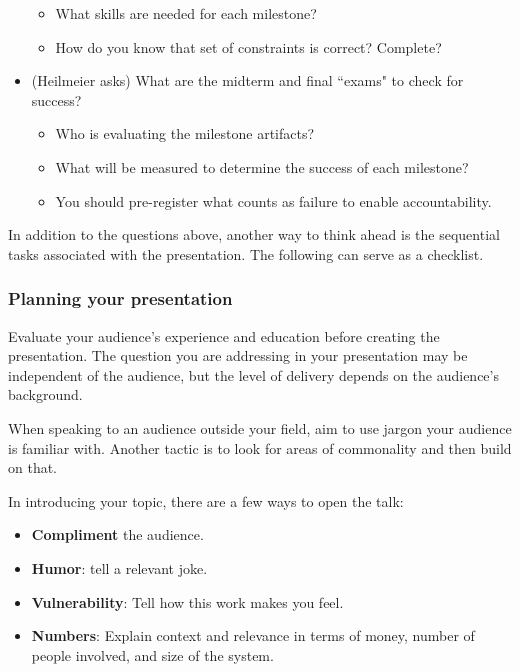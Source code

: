 \begin{itemize}
\begin{itemize}
        \item What skills are needed for each milestone?
        \item How do you know that set of constraints is correct? Complete?
    \end{itemize}
    \item (Heilmeier asks) What are the midterm and final ``exams" to check for success?
    \begin{itemize}
        \item Who is evaluating the milestone artifacts?
        \item What will be measured to determine the success of each milestone?
        \item You should pre-register what counts as failure to enable accountability.
    \end{itemize}
\end{itemize}








In addition to the questions above, another way to think ahead is the sequential tasks associated with the presentation. 
The following can serve as a checklist.

\subsubsection*{Planning your presentation}

Evaluate your audience's experience and education before creating the presentation. The question you are addressing in your presentation may be independent of the audience, but the level of delivery depends on the audience's background.

When speaking to an audience outside your field, aim to use jargon your audience is familiar with. Another tactic is to look for areas of commonality and then build on that.

In introducing your topic, there are a few ways to open the talk:
\begin{itemize}
    \item \textbf{Compliment} the audience.
    \item \textbf{Humor}: tell a relevant joke.
    \item \textbf{Vulnerability}: Tell how this work makes you feel.
    \item \textbf{Numbers}: Explain context and relevance in terms of money, number of people involved, and size of the system.
\end{itemize}


